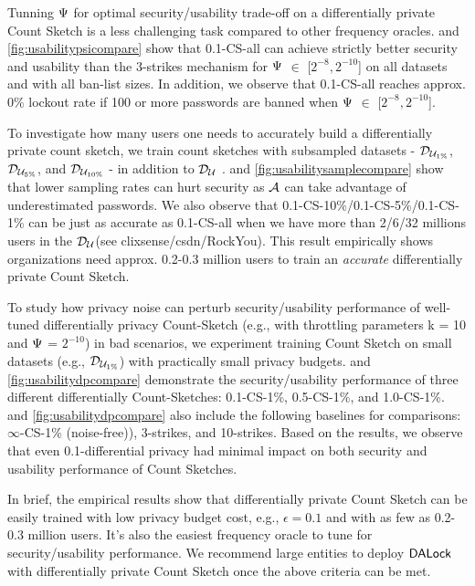 Tunning $\Psi$ for optimal security/usability trade-off on a differentially private Count Sketch is a less challenging task compared to other frequency oracles.  and \ref{fig:usabilitypsicompare} show that 0.1-CS-all can achieve strictly better security and usability than the 3-strikes mechanism for $\Psi$ $\in$ [$2^{-8},2^{-10}$] on all datasets and with all ban-list sizes. In addition, we observe that 0.1-CS-all reaches approx. 0\% lockout rate if 100 or more passwords are banned when $\Psi$ $\in$ [$2^{-8},2^{-10}$]. 

To investigate how many users one needs to accurately build a differentially private count sketch, we train count sketches with subsampled datasets - $\mathcal{D}_{{\mathcal{U}_{1\%}}}$, $\mathcal{D}_{{\mathcal{U}_{5\%}}}$, and $\mathcal{D}_{{\mathcal{U}_{10\%}}}$ - in addition to $\mathcal{D}_{{\mathcal{U}}}$ .  and \ref{fig:usabilitysamplecompare} show that lower sampling rates can hurt security as $\mathcal{A}$ can take advantage of underestimated passwords. We also observe that  0.1-CS-10\%/0.1-CS-5\%/0.1-CS-1\% can be just as accurate as 0.1-CS-all when we have more than 2/6/32 millions users in the $\mathcal{D}_{{\mathcal{U}}}$(see clixsense/csdn/RockYou). This result empirically shows organizations need approx. 0.2-0.3 million users to train an \textit{accurate} differentially private Count Sketch. 

To study how privacy noise can perturb security/usability performance of well-tuned differentially privacy Count-Sketch (e.g., with throttling parameters k = 10 and $\Psi$ = $2^{-10}$) in bad scenarios, we experiment training Count Sketch on small datasets (e.g., $\mathcal{D}_{{\mathcal{U}_{1\%}}}$) with practically small privacy budgets.  and \ref{fig:usabilitydpcompare} demonstrate the security/usability performance of three different differentially Count-Sketches: 0.1-CS-1\%, 0.5-CS-1\%, and 1.0-CS-1\%.   and \ref{fig:usabilitydpcompare} also include the following baselines for comparisons: $\infty$-CS-1\% (noise-free)), 3-strikes, and 10-strikes. Based on the results, we observe that even 0.1-differential privacy had minimal impact on both security and usability performance of Count Sketches. 

In brief, the empirical results show that differentially private Count Sketch can be easily trained with low privacy budget cost, e.g., $\epsilon = 0.1$ and with as few as 0.2-0.3 million users. It's also the easiest frequency oracle to tune for security/usability performance. We recommend large entities to deploy $\mathsf{DALock}$ with differentially private Count Sketch once the above criteria can be met.

